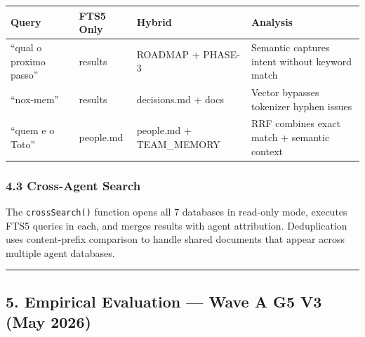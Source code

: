 \documentclass[
]{article}
\newcounter{none} %
\begin{document}
{\def\LTcaptype{none} %
\begin{longtable}[]{@{}
  >{\raggedright\arraybackslash}p{}
  >{\raggedright\arraybackslash}p{}
  >{\raggedright\arraybackslash}p{}
  >{\raggedright\arraybackslash}p{}@{}}
\toprule\noalign{}
\begin{minipage}[b]{\linewidth}\raggedright
Query
\end{minipage} & \begin{minipage}[b]{\linewidth}\raggedright
FTS5 Only
\end{minipage} & \begin{minipage}[b]{\linewidth}\raggedright
Hybrid
\end{minipage} & \begin{minipage}[b]{\linewidth}\raggedright
Analysis
\end{minipage} \\
\midrule\noalign{}
\endhead
\bottomrule\noalign{}
\endlastfoot
``qual o proximo passo'' & 0 results & ROADMAP + PHASE-3 & Semantic
captures intent without keyword match \\
``nox-mem'' & 0 results & decisions.md + docs & Vector bypasses
tokenizer hyphen issues \\
``quem e o Toto'' & people.md & people.md + TEAM\_MEMORY & RRF combines
exact match + semantic context \\
\end{longtable}
}

\subsubsection{4.3 Cross-Agent Search}\label{cross-agent-search}

The \texttt{crossSearch()} function opens all 7 databases in read-only
mode, executes FTS5 queries in each, and merges results with agent
attribution. Deduplication uses content-prefix comparison to handle
shared documents that appear across multiple agent databases.

\begin{center}\rule{0.5\linewidth}{0.5pt}\end{center}

\subsection{5. Empirical Evaluation --- Wave A G5 V3 (May
2026)}\label{empirical-evaluation-wave-a-g5-v3-may-2026}
\end{document}

